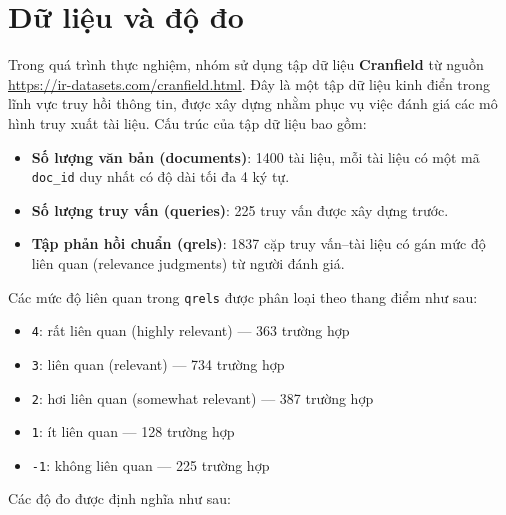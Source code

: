 \section{Dữ liệu và độ đo}
Trong quá trình thực nghiệm, nhóm sử dụng tập dữ liệu \textbf{Cranfield} từ nguồn \url{https://ir-datasets.com/cranfield.html}. Đây là một tập dữ liệu kinh điển trong lĩnh vực truy hồi thông tin, được xây dựng nhằm phục vụ việc đánh giá các mô hình truy xuất tài liệu. Cấu trúc của tập dữ liệu bao gồm:

\begin{itemize}
    \item \textbf{Số lượng văn bản (documents)}: 1400 tài liệu, mỗi tài liệu có một mã \texttt{doc\_id} duy nhất có độ dài tối đa 4 ký tự.
    \item \textbf{Số lượng truy vấn (queries)}: 225 truy vấn được xây dựng trước.
    \item \textbf{Tập phản hồi chuẩn (qrels)}: 1837 cặp truy vấn--tài liệu có gán mức độ liên quan (relevance judgments) từ người đánh giá.
\end{itemize}

Các mức độ liên quan trong \texttt{qrels} được phân loại theo thang điểm như sau:
\begin{itemize}
    \item \texttt{4}: rất liên quan (highly relevant) --- 363 trường hợp
    \item \texttt{3}: liên quan (relevant) --- 734 trường hợp
    \item \texttt{2}: hơi liên quan (somewhat relevant) --- 387 trường hợp
    \item \texttt{1}: ít liên quan --- 128 trường hợp
    \item \texttt{-1}: không liên quan --- 225 trường hợp
\end{itemize}

Các độ đo được định nghĩa như sau:

